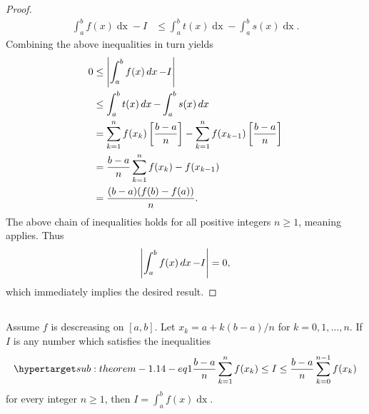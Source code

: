 \documentclass{report}
\begin{document}
\begin{proof}
\begin{align*}
        \int_a^b f(x) \mathop{dx} - I
          & \leq \int_a^b t(x) \mathop{dx} - \int_a^b s(x) \mathop{dx}.
      \end{align*}
    Combining the above inequalities in turn yields
      \begin{align*}
        0
          & \leq \left|\int_a^b f(x) \mathop{dx} - I\right| \\
          & \leq \int_a^b t(x) \mathop{dx} - \int_a^b s(x) \mathop{dx} \\
          & = \sum_{k=1}^n f(x_k) \left[ \frac{b - a}{n} \right] -
              \sum_{k=1}^n f(x_{k-1}) \left[ \frac{b - a}{n} \right] \\
          & = \frac{b - a}{n} \sum_{k=1}^n f(x_k) - f(x_{k-1}) \\
          & = \frac{(b - a)(f(b) - f(a))}{n}.
      \end{align*}
    The above chain of inequalities holds for all positive integers $n \geq 1$,
      meaning  applies.
    Thus $$\left|\int_a^b f(x) \mathop{dx} - I\right| = 0,$$ which immediately implies
      the desired result.
  \end{proof}

\subsection{}%

  \begin{theorem}[1.14]
    Assume $f$ is descreasing on $[a, b]$.
    Let $x_k = a + k(b - a) / n$ for $k = 0, 1, \ldots, n$.
    If $I$ is any number which satisfies the inequalities
      \begin{equation}
        \hyperlabel{sub:theorem-1.14-eq1}
        \frac{b - a}{n} \sum_{k=1}^n f(x_k)
          \leq I \leq
          \frac{b - a}{n} \sum_{k=0}^{n-1} f(x_k)
      \end{equation}
      for every integer $n \geq 1$, then $I = \int_a^b f(x) \mathop{dx}$.
  \end{theorem}
\end{document}
